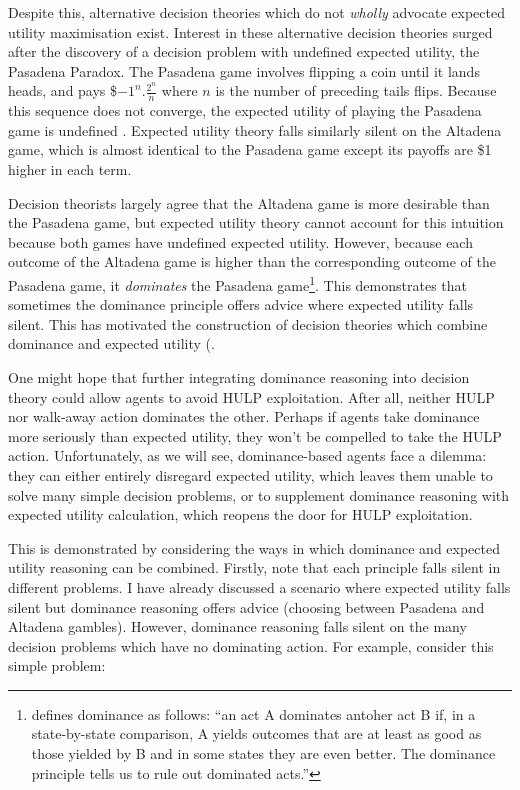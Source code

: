 \documentclass{article}
\begin{document}
Despite this, alternative decision theories which do not \textit{wholly} advocate expected utility maximisation exist. Interest in these alternative decision theories surged after the discovery of a decision problem with undefined expected utility, the Pasadena Paradox. The Pasadena game involves flipping a coin until it lands heads, and pays \$\(-1^n.\frac{2^n}{n}\) where \(n\) is the number of preceding tails flips. Because this sequence does not converge, the expected utility of playing the Pasadena game is undefined \citep{nover2004vexing}. Expected utility theory falls similarly silent on the Altadena game, which is almost identical to the Pasadena game except its payoffs are \$1 higher in each term.

Decision theorists largely agree that the Altadena game is more desirable than the Pasadena game, but expected utility theory cannot account for this intuition because both games have undefined expected utility. However, because each outcome of the Altadena game is higher than the corresponding outcome of the Pasadena game, it \textit{dominates} the Pasadena game\footnote{\citep[pg. 9]{resnik1987choices} defines dominance as follows: ``an act A dominates antoher act B if, in a state-by-state comparison, A yields outcomes that are at least as good as those yielded by B and in some states they are even better. The dominance principle tells us to rule out dominated acts.''}. This demonstrates that sometimes the dominance principle offers advice where expected utility falls silent. This has motivated the construction of decision theories which combine dominance and expected utility (\citep{easwaran2009dominance, colyvan2008relative, colyvan2006no}.

One might hope that further integrating dominance reasoning into decision theory could allow agents to avoid HULP exploitation. After all, neither HULP nor walk-away action dominates the other. Perhaps if agents take dominance more seriously than expected utility, they won't be compelled to take the HULP action. Unfortunately, as we will see, dominance-based agents face a dilemma: they can either entirely disregard expected utility, which leaves them unable to solve many simple decision problems, or to supplement dominance reasoning with expected utility calculation, which reopens the door for HULP exploitation.

This is demonstrated by considering the ways in which dominance and expected utility reasoning can be combined. Firstly, note that each principle falls silent in different problems. I have already discussed a scenario where expected utility falls silent but dominance reasoning offers advice (choosing between Pasadena and Altadena gambles). However, dominance reasoning falls silent on the many decision problems which have no dominating action. For example, consider this simple problem:
\end{document}

